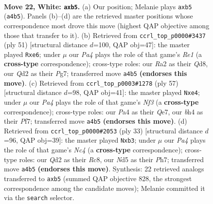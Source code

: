 \documentclass[11pt]{article}
\begin{document}
\clearpage

\begin{figure}[p]\centering
\begin{subfigure}{0.46\textwidth}\centering
\resizebox{\linewidth}{!}{%
\newchessgame
\chessboard[
  setfen={rn1qk1r1/5p2/1p1p4/pbpN4/P3P2b/5N1P/RP1Q2P1/3K3R w q - 0 22},
  showmover=false,
  pgfstyle=straightmove, color=movearrow, markmove={a4-b5}
]}
\caption{}
\end{subfigure}\hfill
\begin{subfigure}{0.46\textwidth}\centering
\resizebox{\linewidth}{!}{%
\newchessgame
\chessboard[
  setfen={r2qr1k1/1p4pp/2p1R3/p2n4/5p2/bP1P1NP1/1B3PBP/1Q1R2K1 b - - 0 26},
  showmover=false,
  pgfstyle=straightmove, color=movearrow, markmove={e8-e6}
]}
\caption{}
\end{subfigure}
\\[4pt]
\begin{subfigure}{0.46\textwidth}\centering
\resizebox{\linewidth}{!}{%
\newchessgame
\chessboard[
  setfen={2r3k1/2r1qpp1/1p3n1p/p2p4/3BB3/PP2P1PP/R3QP2/3R2K1 b - - 0 29},
  showmover=false,
  pgfstyle=straightmove, color=movearrow, markmove={f6-e4}
]}
\caption{}
\end{subfigure}\hfill
\begin{subfigure}{0.46\textwidth}\centering
\resizebox{\linewidth}{!}{%
\newchessgame
\chessboard[
  setfen={2r1k2r/1p4pp/p2p1b2/2nN4/4P3/qB6/P1PQ2PP/1R2K2R b Kk - 1 17},
  showmover=false,
  pgfstyle=straightmove, color=movearrow, markmove={c5-b3}
]}
\caption{}
\end{subfigure}
\caption{\textbf{Move 22, White: \texttt{axb5}.} (a) Our position; Melanie plays \texttt{axb5} (\texttt{a4b5}). Panels (b)--(d) are the retrieved master positions whose correspondence most drove this move (highest QAP objective among those that transfer to it). (b) Retrieved from \texttt{ccrl\_top\_p0000\#3437} (ply 51) [structural distance $d$=100, QAP obj=47]: the master played \texttt{Rxe6}; under $\mu$ our \emph{Pa4} plays the role of that game's \emph{Re1} (a \textbf{cross-type} correspondence); cross-type roles: our \emph{R}a2 as their \emph{Q}d8, our \emph{Q}d2 as their \emph{P}g7; transferred move \texttt{a4b5} \textbf{(endorses this move)}. (c) Retrieved from \texttt{ccrl\_top\_p0003\#1278} (ply 57) [structural distance $d$=98, QAP obj=41]: the master played \texttt{Nxe4}; under $\mu$ our \emph{Pa4} plays the role of that game's \emph{Nf3} (a \textbf{cross-type} correspondence); cross-type roles: our \emph{P}a4 as their \emph{Q}e7, our \emph{b}h4 as their \emph{P}f7; transferred move \texttt{a4b5} \textbf{(endorses this move)}. (d) Retrieved from \texttt{ccrl\_top\_p0000\#2053} (ply 33) [structural distance $d$=96, QAP obj=39]: the master played \texttt{Nxb3}; under $\mu$ our \emph{Pa4} plays the role of that game's \emph{Nc4} (a \textbf{cross-type} correspondence); cross-type roles: our \emph{Q}d2 as their \emph{R}c8, our \emph{N}d5 as their \emph{P}h7; transferred move \texttt{a4b5} \textbf{(endorses this move)}. Synthesis: 22 retrieved analogs transferred to \texttt{axb5} (summed QAP objective 828, the strongest correspondence among the candidate moves); Melanie committed it via the \texttt{search} selector.}
\label{fig:thought-m42}
\end{figure}
\end{document}
